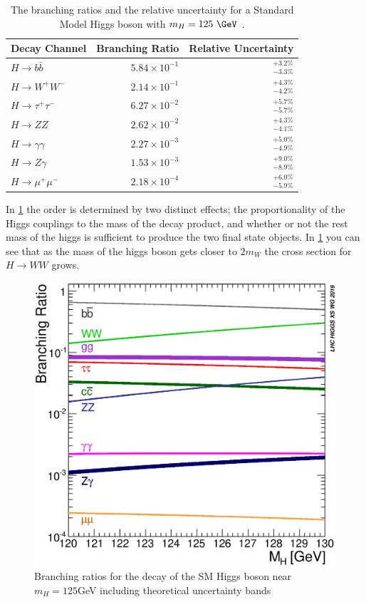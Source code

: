 \begin{table}[htpb]
 \centering
 \caption{ The branching ratios and the relative uncertainty for a Standard Model Higgs boson with $m_{H}=125~\GeV$ \cite{PDG2018:Ch11}.}
 \begin{tabular}{@{}lrr@{}} \toprule
  Decay Channel           & Branching Ratio       & Relative Uncertainty \\ \midrule
  $H\to b\bar{b}$         & $5.84 \times 10^{-1}$ & $_{-3.3\%}^{+3.2\%}$ \\
  \addlinespace[0.3em]
  $H\to W^{+}W^{-}$       & $2.14 \times 10^{-1}$ & $_{-4.2\%}^{+4.3\%}$ \\
  \addlinespace[0.3em]
  $H\to \tau^{+}\tau^{-}$ & $6.27 \times 10^{-2}$ & $_{-5.7\%}^{+5.7\%}$ \\
  \addlinespace[0.3em]
  $H\to ZZ$               & $2.62 \times 10^{-2}$ & $_{-4.1\%}^{+4.3\%}$ \\
  \addlinespace[0.3em]
  $H\to \gamma\gamma$     & $2.27 \times 10^{-3}$ & $_{-4.9\%}^{+5.0\%}$ \\
  \addlinespace[0.3em]
  $H\to Z\gamma$          & $1.53 \times 10^{-3}$ & $_{-8.9\%}^{+9.0\%}$ \\
  \addlinespace[0.3em]
  $H\to \mu^{+}\mu^{-}$   & $2.18 \times 10^{-4}$ & $_{-5.9\%}^{+6.0\%}$ \\
  \bottomrule
 \end{tabular}\label{table:higgs_branching_ratios}
\end{table} 

In \cref{table:higgs_branching_ratios} the order is determined by two distinct effects; 
the proportionality of the Higgs couplings to the mass of the decay product, and whether 
or not the rest mass of the higgs is sufficient to produce the two final state objects.  
In \cref{fig:higgs_decay_plot} you can see that as the mass of the higgs boson gets 
closer to $2m_W$ the cross section for $H \rightarrow WW$ grows.

\begin{figure}[!htbp]
  \begin{center}
    \includegraphics[width=0.5\linewidth]{figures/higgs/higgs_decay_plot.eps}
    \caption{Branching ratios for the decay of the SM Higgs boson near $m_{H} = 125$GeV including theoretical uncertainty bands \cite{PDG2018:Ch11}}
    \label{fig:higgs_decay_plot}
  \end{center}
\end{figure}


